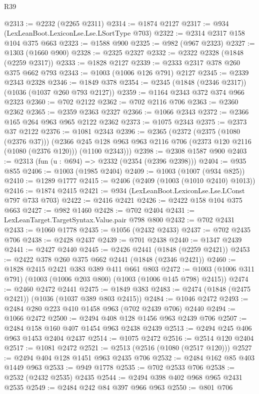 \begin{lexlean}{R39}
\begin{coremodule}
@2313 := @2232 (@2265 @2311)
@2314 := @1874 @2127
@2317 := @934 (LexLeanBoot.LexiconLse.Lse.LSortType @703)
@2322 := @2314 @2317 @158 @104 @375 @663
@2323 := @1588 @900
@2325 := @982 (@967 @2323)
@2327 := @1303 (@1660 @900)
@2328 := @2325 @2327
@2332 := @2322 @2328 (@1848 (@2259 @2317))
@2333 := @1828 @2127
@2339 := @2333 @2317 @378 @260 @375 @662 @793
@2343 := @1003 (@1006 @126 @791) @2127
@2345 := @2339 @2343 @2328
@2346 := @1849 @378
@2354 := @2345 (@1848 (@2346 @2317)) (@1036 (@1037 @260 @793 @2127))
@2359 := @1164 @2343 @372 @374 @966 @2323
@2360 := @702 @2122
@2362 := @702 @2116 @706
@2363 := @2360 @2362
@2365 := @2359 @2363 @2327
@2366 := @1066 @2343
@2372 := @2366 @165 @264 @963 @965 @2122 @2362
@2373 := @1075 @2343
@2375 := @2373 @37 @2122
@2376 := @1081 @2343
@2396 := @2365
    (@2372
      (@2375 (@1080 (@2376 @37)))
      (@2366 @245 @128 @963 @963 @2116 @706 (@2373 @120 @2116 (@1080 (@2376 @120))) (@1100 @2343)))
@2398 := @2308 @1587 @900
@2403 := @2313 (fun (u : @694) => @2332 (@2354 (@2396 @2398)))
@2404 := @935 @855
@2406 := @1003 (@1985 @2404)
@2409 := @1003 (@1007 (@934 @825))
@2410 := @1289 @1777
@2415 := @2406 (@2409 (@1003 (@1010 @2410) @1013))
@2416 := @1874 @2415
@2421 := @934 (LexLeanBoot.LexiconLse.Lse.LConst @797 @733 @703)
@2422 := @2416 @2421
@2426 := @2422 @158 @104 @375 @663
@2427 := @982 @1460
@2428 := @702 @2404
@2431 := LexLeanTarget.TargetSyntax.Value.pair @798 @800
@2432 := @702 @2431
@2433 := @1060 @1778
@2435 := @1056 (@2432 @2433)
@2437 := @702 @2435 @706
@2438 := @2428 @2437
@2439 := @701 @2438
@2440 := @1347 @2439
@2441 := @2427 @2440
@2445 := @2426 @2441 (@1848 (@2259 @2421))
@2453 := @2422 @378 @260 @375 @662 @2441 (@1848 (@2346 @2421))
@2460 := @1828 @2415 @2421 @383 @389 @411 @661 @803
@2472 := @1003 (@1006 @311 @791) (@1003 (@1006 @203 @800) (@1003 (@1006 @145 @798) @2415))
@2474 := @2460 @2472 @2441
@2475 := @1849 @383
@2483 := @2474 (@1848 (@2475 @2421)) (@1036 (@1037 @389 @803 @2415))
@2484 := @1046 @2472
@2493 := @2484 @280 @223 @410 @1458 @963 (@702 @2439 @706) @2440
@2494 := @1066 @2472
@2500 := @2494 @408 @128 @1456 @963 @2439 @706
@2507 := @2484 @158 @160 @407 @1454 @963 @2438 @2439
@2513 := @2494 @245 @406 @963 @1453 @2404 @2437
@2514 := @1075 @2472
@2516 := @2514 @120 @2404
@2517 := @1081 @2472
@2521 := @2513 (@2516 (@1080 (@2517 @120)))
@2527 := @2494 @404 @128 @1451 @963 @2435 @706
@2532 := @2484 @162 @85 @403 @1449 @963
@2533 := @949 @1778
@2535 := @702 @2533 @706
@2538 := @2532 (@2432 @2535) @2435
@2544 := @2494 @398 @402 @968 @965 @2431 @2535
@2549 := @2484 @242 @84 @397 @966 @963
@2550 := @801 @706

\end{coremodule}
\end{lexlean}
